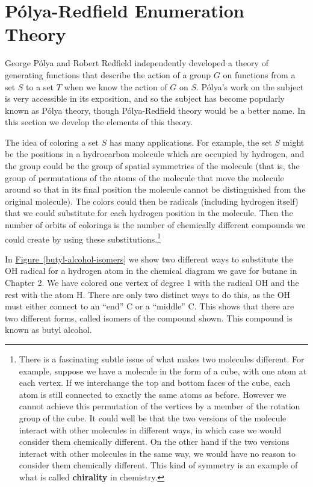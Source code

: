 \documentclass[10pt,]{book}
\newcommand{\terminology}[1]{\textbf{#1}}
\theoremstyle{plain}
\theoremstyle{definition}
\theoremstyle{definition}
\numberwithin{equation}{chapter}
\begin{document}
\section[{Pólya-Redfield Enumeration Theory}]{Pólya-Redfield Enumeration Theory}\label{sec_groups-polya}
George Pólya and Robert Redfield independently developed a theory of generating functions that describe the action of a group \(G\) on functions from a set \(S\) to a set \(T\) when we know the action of \(G\) on \(S\). Pólya's work on the subject is very accessible in its exposition, and so the subject has become popularly known as Pólya theory, though Pólya-Redfield theory would be a better name. In this section we develop the elements of this theory.%
\par
The idea of coloring a set \(S\) has many applications. For example, the set \(S\) might be the positions in a hydrocarbon molecule which are occupied by hydrogen, and the group could be the group of spatial symmetries of the molecule (that is, the group of permutations of the atoms of the molecule that move the molecule around so that in its final position the molecule cannot be distinguished from the original molecule). The colors could then be radicals (including hydrogen itself) that we could substitute for each hydrogen position in the molecule. Then the number of orbits of colorings is the number of chemically different compounds we could create by using these substitutions.\footnote{There is a fascinating subtle issue of what makes two molecules different.  For example, suppose we have a molecule in the form of a cube, with one atom at each vertex.  If we interchange the top and bottom faces of the cube, each atom is still connected to exactly the same atoms as before.   However we cannot achieve this permutation of the vertices by a member of the rotation group of the cube.  It could well be that the two versions of the molecule interact with other molecules in different ways, in which case we would consider them chemically different.  On the other hand if the two versions interact with other molecules in the same way, we would have no reason to consider them chemically different.  This kind of symmetry is an example of what is called \terminology{chirality} in chemistry.\label{fn-24}}%
\par
In \hyperref[butyl-alcohol-isomers]{Figure~\ref{butyl-alcohol-isomers}} we show two different ways to substitute the OH radical for a hydrogen atom in the chemical diagram we gave for butane in Chapter 2. We have colored one vertex of degree 1 with the radical OH and the rest with the atom H. There are only two distinct ways to do this, as the OH must either connect to an ``end'' C or a ``middle'' C. This shows that there are two different forms, called isomers of the compound shown. This compound is known as butyl alcohol.%
\end{document}
